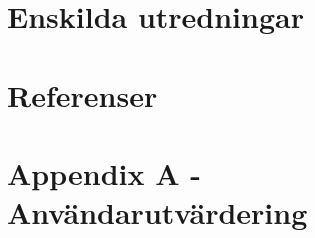 \documentclass{article}
\begin{document}
\begin{description}
\end{description}

\newpage
\part{Enskilda utredningar}
\renewcommand{\thesection}{\Alph{section}}	

\newpage

\newpage

\newpage

\newpage

\newpage

\newpage

\newpage

\part{Referenser}

\newpage

\part{Appendix A - Användarutvärdering}

\end{document}
